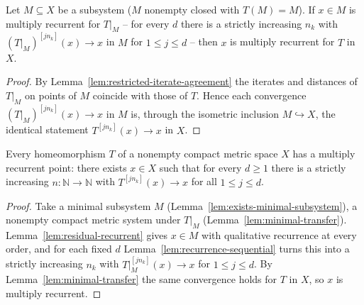 \begin{lemma}
    \label{lem:minimal-transfer}
    \leanok
    Let $M \subseteq X$ be a subsystem ($M$ nonempty closed with $T(M) = M$). If
    $x \in M$ is multiply recurrent for $T|_M$ -- for every $d$ there is a
    strictly increasing $n_k$ with $(T|_M)^{[j n_k]}(x) \to x$ in $M$ for
    $1 \le j \le d$ -- then $x$ is multiply recurrent for $T$ in $X$.
\end{lemma}
\begin{proof}
    By Lemma~\ref{lem:restricted-iterate-agreement} the iterates and distances of
    $T|_M$ on points of $M$ coincide with those of $T$. Hence each convergence
    $(T|_M)^{[j n_k]}(x) \to x$ in $M$ is, through the isometric inclusion
    $M \hookrightarrow X$, the identical statement $T^{[j n_k]}(x) \to x$ in $X$.
\end{proof}

\begin{theorem}
    \label{thm:furstenberg-topological-recurrence}
    \leanok
    Every homeomorphism $T$ of a nonempty compact metric space $X$ has a
    multiply recurrent point: there exists $x \in X$ such that for every
    $d \ge 1$ there is a strictly increasing $n : \mathbb{N} \to \mathbb{N}$ with
    $T^{[j n_k]}(x) \to x$ for all $1 \le j \le d$.
\end{theorem}
\begin{proof}
    Take a minimal subsystem $M$ (Lemma~\ref{lem:exists-minimal-subsystem}),
    a nonempty compact metric system under $T|_M$
    (Lemma~\ref{lem:minimal-transfer}).
    Lemma~\ref{lem:residual-recurrent} gives $x \in M$ with qualitative
    recurrence at every order, and for each fixed $d$
    Lemma~\ref{lem:recurrence-sequential} turns this into a strictly increasing
    $n_k$ with $T|_M^{[j n_k]}(x) \to x$ for $1 \le j \le d$. By
    Lemma~\ref{lem:minimal-transfer} the same convergence holds for $T$ in $X$,
    so $x$ is multiply recurrent.
\end{proof}


